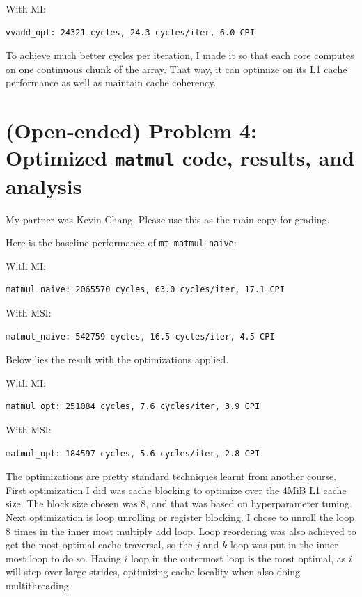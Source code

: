 \documentclass[11pt]{article}
\begin{document}
With MI:
\begin{verbatim}
vvadd_opt: 24321 cycles, 24.3 cycles/iter, 6.0 CPI
\end{verbatim}

To achieve much better cycles per iteration, I made it so that each core computes on one continuous chunk of the array. That way, it can optimize on its L1 cache performance as well as maintain cache coherency.
\newpage

\section*{(Open-ended) Problem 4: Optimized \texttt{matmul} code, results, and analysis}
My partner was Kevin Chang. Please use this as the main copy for grading.

Here is the baseline performance of \verb|mt-matmul-naive|:

With MI:
\begin{verbatim}
matmul_naive: 2065570 cycles, 63.0 cycles/iter, 17.1 CPI
\end{verbatim}

With MSI:
\begin{verbatim}
matmul_naive: 542759 cycles, 16.5 cycles/iter, 4.5 CPI
\end{verbatim}

Below lies the result with the optimizations applied.

With MI:
\begin{verbatim}
matmul_opt: 251084 cycles, 7.6 cycles/iter, 3.9 CPI
\end{verbatim}

With MSI:
\begin{verbatim}
matmul_opt: 184597 cycles, 5.6 cycles/iter, 2.8 CPI
\end{verbatim}

The optimizations are pretty standard techniques learnt from another course. First optimization I did was cache blocking to optimize over the 4MiB L1 cache size. The block size chosen was 8, and that was based on hyperparameter tuning. Next optimization is loop unrolling or register blocking. I chose to unroll the loop 8 times in the inner most multiply add loop. Loop reordering was also achieved to get the most optimal cache traversal, so the $j$ and $k$ loop was put in the inner most loop to do so. Having $i$ loop in the outermost loop is the most optimal, as $i$ will step over large strides, optimizing cache locality when also doing multithreading.
\end{document}
